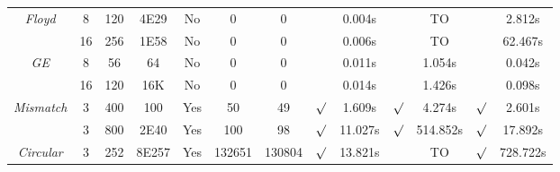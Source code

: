 \begin{savenotes}
\begin{table*}[t]
\begin{center}
\begin{threeparttable}
\begin{tabular}{|c|c|c|c|c|c|c|c|c|c|c|c|c|}
						       
	    \multirow{2}{*}{\textit{Floyd}} & 8 & 120 &  4E29 
          						        & No  &0 &0&  & 0.004s &  & TO &  & 2.812s\\ \cline{2-13}
						       		& 16 & 256 &  1E58 
          						         & No  &0 & 0&  & 0.006s &  & TO &  & 62.467s\\ \hline
						        \hline
	    \multirow{2}{*}{\textit{GE}} & 8 & 56 & 64  
          						        & No  &0 &0&  & 0.011s &  & 1.054s &  & 0.042s\\ \cline{2-13}
						       		& 16 & 120 & 16K  
          						         & No  &0 & 0&  & 0.014s &  & 1.426s &  & 0.098s\\ \hline
						        \hline
			        
             
						        
	     \multirow{2}{*}{\textit{Mismatch}} & 3 & 400 & 100  & Yes  &50 &49 & $\surd$ & 1.609s  & $\surd$  & 4.274s & $\surd$ & 2.601s\\ \cline{2-13}
          					& 3 & 800 & 2E40  & Yes  &100& 98 & $\surd$ & 11.027s  & $\surd$ & 514.852s & $\surd$ & 17.892s\\ \hline
          \hline
          
           \textit{Circular} & 3 & 252 & 8E257  & Yes  & 132651 & 130804 & $\surd$ & 13.821s  &  & TO & $\surd$ & 728.722s\\ \hline

						                       
\end{tabular}
\end{threeparttable}
\end{center}
\end{table*}
\end{savenotes}

